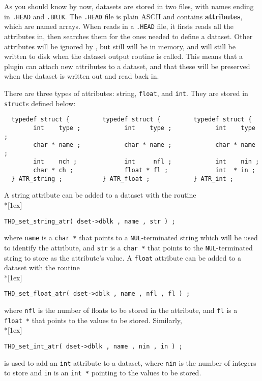     As you should know by now,
    \afnit datasets are stored in two files, with names ending
    in {\tt .HEAD} and {\tt .BRIK}.  The {\tt .HEAD} file is plain ASCII and
    contains {\bf attributes}, which are named arrays.
    When \afnit reads in a
    {\tt .HEAD} file, it firsts reads all the attributes in,
    then searches them for the ones needed to define a dataset.
    Other attributes will be ignored by \afni\@, but still will
    be in memory, and will still be written to disk when the
    dataset output routine is called.  This means that
    a plugin can attach new attributes to a dataset, and that
    these will be preserved when the dataset is written out
    and read back in.

\vset
    There are three types of attributes: string, {\tt float}, and {\tt int}.
    They are stored in {\tt struct}s defined below:
\goodbreak
\begin{samepage}\begin{verbatim}
  typedef struct {         typedef struct {         typedef struct {
        int    type ;            int    type ;            int    type ;
        char * name ;            char * name ;            char * name ;
        int    nch ;             int     nfl ;            int    nin ;
        char * ch ;              float * fl ;             int  * in ;
  } ATR_string ;           } ATR_float ;            } ATR_int ;
\end{verbatim}\end{samepage}
    A string attribute can be added to a dataset with the routine\\*[1ex]
\centerline{\tt THD\_set\_string\_atr( dset->dblk , name , str ) ;}\vspace{1ex}
    where {\tt name} is a {\tt char~*} that points to a {\tt NUL}-terminated
    string which will be used to identify the attribute, and {\tt str} is
    a {\tt char~*} that points to the {\tt NUL}-terminated string to store as the
    attribute's value.
    A {\tt float} attribute can be added to a dataset with the routine\\*[1ex]
\centerline{\tt THD\_set\_float\_atr( dset->dblk , name , nfl , fl ) ;}\vspace{1ex}
    where {\tt nfl} is the number of floats to be stored in the attribute,
    and {\tt fl} is a {\tt float~*} that points to the values to be stored.
    Similarly,\\*[1ex]
\centerline{\tt THD\_set\_int\_atr( dset->dblk , name , nin , in ) ;}\vspace{1ex}
    is used to add an {\tt int} attribute to a dataset, where {\tt nin} is the
    number of integers to store and {\tt in} is an {\tt int~*} pointing
    to the values to be stored.

